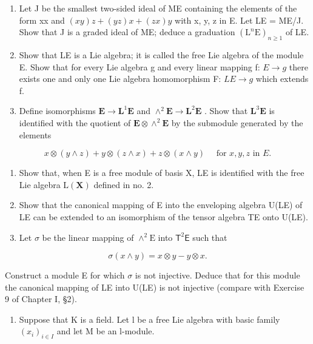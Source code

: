 \begin{enumerate}
\def\labelenumi{(\alph{enumi})}
\item
  Let J be the smallest two-sided ideal of ME containing the elements of the form xx and \((xy)z + (yz)x + (zx)y\) with x, y, z in E. Let LE = ME/J. Show that J is a graded ideal of ME; deduce a graduation \((\mathrm{L}^{n}\mathrm{E})_{n\geqslant1}\) of LE.
\item
  Show that LE is a Lie algebra; it is called the free Lie algebra of the module E. Show that for every Lie algebra g and every linear mapping f: \(E \to g\) there exists one and only one Lie algebra homomorphism F: \(LE \to g\) which extends f.
\item
  Define isomorphisms \(\mathbf{E} \to \mathbf{L}^1\mathbf{E}\) and \(\wedge^2\mathbf{E} \to \mathbf{L}^2\mathbf{E}\) . Show that \(\mathbf{L}^3\mathbf{E}\) is identified with the quotient of \(\mathbf{E} \otimes \wedge^2\mathbf{E}\) by the submodule generated by the elements
\end{enumerate}

\[
x \otimes (y \wedge z) + y \otimes (z \wedge x) + z \otimes (x \wedge y) \quad \text { for } x, y, z \text { in } E.
\]

\begin{enumerate}
\def\labelenumi{(\alph{enumi})}
\setcounter{enumi}{3}
\item
  Show that, when E is a free module of basis X, LE is identified with the free Lie algebra \(\mathrm{L}(\mathbf{X})\) defined in no. 2.
\item
  Show that the canonical mapping of E into the enveloping algebra U(LE) of LE can be extended to an isomorphism of the tensor algebra TE onto U(LE).
\item
  Let \(\sigma\) be the linear mapping of \(\wedge^2\mathrm{E}\) into \(\mathsf{T}^2\mathsf{E}\) such that
\end{enumerate}

\[
\sigma (x \wedge y) = x \otimes y - y \otimes x.
\]

Construct a module E for which \(\sigma\) is not injective. Deduce that for this module the canonical mapping of LE into U(LE) is not injective (compare with Exercise 9 of Chapter I, §2).

\begin{enumerate}
\def\labelenumi{\arabic{enumi}.}
\setcounter{enumi}{6}
\tightlist
\item
  Suppose that K is a field. Let l be a free Lie algebra with basic family \((x_{i})_{i\in I}\) and let M be an l-module.
\end{enumerate}

